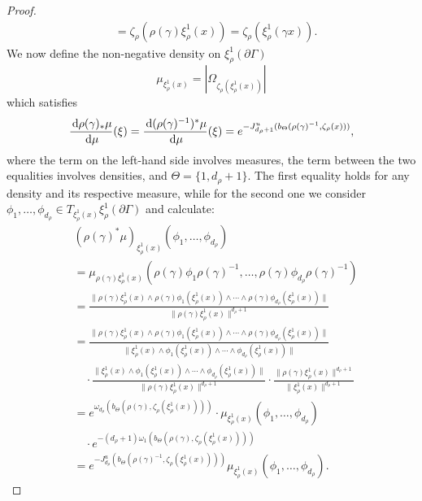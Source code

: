 \documentclass{report}
\begin{document}
\begin{proof}
\begin{align*}
        &= \zeta_\rho(\rho(\gamma) \xi_\rho^1(x)) = 
        \zeta_\rho( \xi_\rho^1(\gamma x)).
    \end{align*}
    We now define the non-negative density on $\xi_\rho^1(\partial \Gamma)$
    \[
        \mu_{\xi_\rho^1(x)} = |\Omega_{\zeta_\rho(\xi_\rho^1(x))}|
    \]
    which satisfies
    \[
        \frac{\,\mathrm{d} \rho(\gamma)_*\mu}{\,\mathrm{d}\mu}(\xi) = \frac{\,\mathrm{d} (\rho(\gamma)^{-1})^*\mu}{\,\mathrm{d}\mu}(\xi) =
        e^{-J^u_{d_\rho + 1}(b_\Theta(\rho(\gamma)^{-1}, \zeta_\rho(x)))},
    \]
    where the term on the left-hand side involves measures, the term between the two equalities involves densities, and $\Theta = \{1, d_\rho + 1\}$.
    The first equality holds for any density and its respective measure, while for the second one we consider $\phi_1, \ldots, \phi_{d_\rho} \in T_{\xi_\rho^1(x)}\xi_\rho^1(\partial \Gamma)$ and calculate:
    \begin{align*}
        &(\rho(\gamma)^*\mu)_{\xi_\rho^1(x)} (\phi_1, \ldots, \phi_{d_\rho})\\
        &=
        \mu_{\rho(\gamma)\xi_\rho^1(x)} (\rho(\gamma)\phi_1\rho(\gamma)^{-1}, \ldots, \rho(\gamma)\phi_{d_\rho} \rho(\gamma)^{-1}) \\
        &=
        \frac{\|\rho(\gamma) \xi_\rho^1(x) \wedge \rho(\gamma) \phi_1(\xi_\rho^1(x)) \wedge \cdots \wedge \rho(\gamma) \phi_{d_\rho}(\xi_\rho^1(x))\|}
        {\| \rho(\gamma) \xi_\rho^1(x) \|^{d_\rho + 1}} \\
        &=
        \frac{\|\rho(\gamma) \xi_\rho^1(x) \wedge \rho(\gamma) \phi_1(\xi_\rho^1(x)) \wedge \cdots \wedge \rho(\gamma) \phi_{d_\rho}(\xi_\rho^1(x))\|}
        {\|\xi_\rho^1(x) \wedge \phi_1(\xi_\rho^1(x)) \wedge \cdots \wedge \phi_{d_\rho}(\xi_\rho^1(x))\|} \\
        &\quad \cdot
        \frac{\|\xi_\rho^1(x) \wedge \phi_1(\xi_\rho^1(x)) \wedge \cdots \wedge \phi_{d_\rho}(\xi_\rho^1(x))\|}
        {\|\rho(\gamma) \xi_\rho^1(x)\|^{d_\rho+1}}\cdot
        \frac{\| \rho(\gamma)\xi_\rho^1(x)\|^{d_\rho+1}}{\|\xi_\rho^1(x)\|^{d_\rho+1}} \\
         &=
         e^{\omega_{d_\rho}(b_\Theta(\rho(\gamma), \zeta_\rho(\xi_\rho^1(x))))} \cdot
         \mu_{\xi_\rho^1(x)}(\phi_1, \ldots, \phi_{d_\rho}) \\
         &\quad \cdot
         e^{-(d_\rho+1)\omega_1(b_\Theta(\rho(\gamma), \zeta_\rho(\xi_\rho^1(x))))} \\
         &=
         e^{-J_{d_\rho}^u(b_\Theta(\rho(\gamma)^{-1}, \zeta_\rho(\xi_\rho^1(x))))} \mu_{\xi_\rho^1(x)}(\phi_1, \ldots, \phi_{d_\rho}).
    \end{align*}
    

\end{proof}
\end{document}
